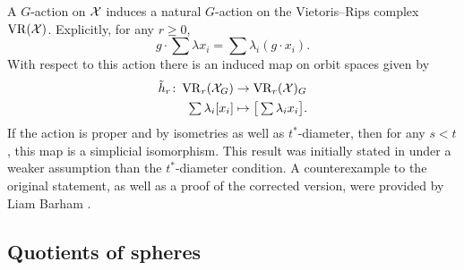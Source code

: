 A \(G\)-action on $\mathcal{X}$ induces a natural \(G\)-action on the Vietoris--Rips complex $\operatorname{VR}(\mathcal{X})$.
Explicitly, for any \(r \geq 0\),
\[
g \cdot \sum \lambda x_i = \sum \lambda_i (g\cdot x_i).
\]
With respect to this action there is an induced map on orbit spaces given by
\begin{align*}
	\tilde h_r \colon \operatorname{VR}_r(\mathcal{X}_G) &\to \operatorname{VR}_r(\mathcal{X})_G \\
	\textstyle\sum\lambda_i [x_i] &\mapsto \textstyle \big[\sum\lambda_i x_i\big].
\end{align*}
If the action is proper and by isometries as well as \(t^*\)-diameter, then for any \(s < t\), this map is a simplicial isomorphism.
This result was initially stated in \cite[Prop.~3.5]{adams2022metric} under a weaker assumption than the \(t^*\)-diameter condition.
A counterexample to the original statement, as well as a proof of the corrected version, were provided by Liam Barham \cite{bibid}.



%

\subsection{Quotients of spheres}

